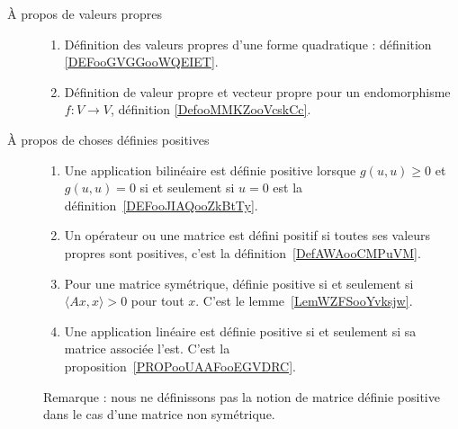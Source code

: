 
        \label{THEMEooYEVLooWotqMY}
\begin{description}
	\item[À propos de valeurs propres]
	      \begin{enumerate}
		      \item
		            Définition des valeurs propres d'une forme quadratique : définition \ref{DEFooGVGGooWQEIET}.
		      \item
		            Définition de valeur propre et vecteur propre pour un endomorphisme \( f\colon V\to V\), définition \ref{DefooMMKZooVcskCc}.
	      \end{enumerate}
	\item[À propos de choses définies positives]
	      \begin{enumerate}
		      \item
		            Une application bilinéaire est définie positive lorsque \( g(u,u)\geq 0\) et \( g(u,u)=0\) si et seulement si \( u=0\) est la définition~\ref{DEFooJIAQooZkBtTy}.
		      \item
		            Un opérateur ou une matrice est défini positif si toutes ses valeurs propres sont positives, c'est la définition~\ref{DefAWAooCMPuVM}.
		      \item
		            Pour une matrice symétrique, définie positive si et seulement si \( \langle Ax, x\rangle >0\) pour tout \( x\). C'est le lemme~\ref{LemWZFSooYvksjw}.
		      \item
		            Une application linéaire est définie positive si et seulement si sa matrice associée l'est. C'est la proposition~\ref{PROPooUAAFooEGVDRC}.
	      \end{enumerate}
	      Remarque : nous ne définissons pas la notion de matrice définie positive dans le cas d'une matrice non symétrique.
\end{description}

